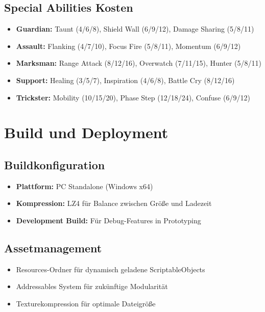 \subsection{Special Abilities Kosten}
\begin{itemize}
    \item \textbf{Guardian:} Taunt (4/6/8), Shield Wall (6/9/12), Damage Sharing (5/8/11)
    \item \textbf{Assault:} Flanking (4/7/10), Focus Fire (5/8/11), Momentum (6/9/12)
    \item \textbf{Marksman:} Range Attack (8/12/16), Overwatch (7/11/15), Hunter (5/8/11)
    \item \textbf{Support:} Healing (3/5/7), Inspiration (4/6/8), Battle Cry (8/12/16)
    \item \textbf{Trickster:} Mobility (10/15/20), Phase Step (12/18/24), Confuse (6/9/12)
\end{itemize}

\section{Build und Deployment}

\subsection{Buildkonfiguration}
\begin{itemize}
    \item \textbf{Plattform:} PC Standalone (Windows x64)
    \item \textbf{Kompression:} LZ4 für Balance zwischen Größe und Ladezeit
    \item \textbf{Development Build:} Für Debug-Features in Prototyping
\end{itemize}

\subsection{Assetmanagement}
\begin{itemize}
    \item Resources-Ordner für dynamisch geladene ScriptableObjects
    \item Addressables System für zukünftige Modularität
    \item Texturekompression für optimale Dateigröße
\end{itemize}
